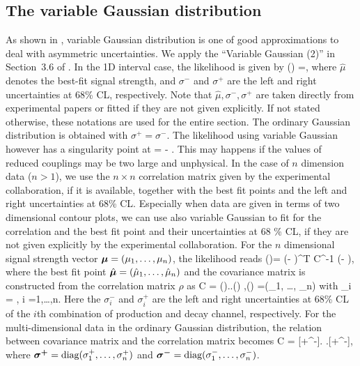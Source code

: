 \subsection*{The variable Gaussian distribution}
As shown in \cite{Barlow:2004wg}, variable Gaussian distribution is one of good approximations to deal with 
asymmetric uncertainties. We apply the  ``Variable Gaussian (2)''  in  Section~3.6 of \cite{Barlow:2004wg}. 
In the 1D interval case, the likelihood is given by
\be \logL(\mu) =,\ee
where $\hat\mu$ denotes the best-fit signal strength, and $\sigma^-$ and $\sigma^+$ are the left and right uncertainties at 68\%
CL, respectively. Note that $\hat\mu, \sigma^-,\sigma^+$ are taken directly from experimental papers or fitted
if they are not given explicitly. If not stated otherwise, these notations are used for the entire section. 
The ordinary Gaussian distribution is obtained with  $\sigma^+ =\sigma^-$. The likelihood using variable Gaussian
however has a singularity point  at 
\be \mu= \hat\mu - \frac{\sigma^+\sigma^-}{\sigma^+ -\sigma^-}.\ee
This may happens if the values of reduced couplings may be two large and unphysical.
 In the case
of $n$ dimension data ($n>1$), we use the $n\times n$ correlation matrix  given by the experimental collaboration, if it is available,
together with the best fit points and the left and right uncertainties at 68\% CL.
Especially when data are given in terms of two dimensional contour plots, we can use also variable Gaussian to fit for the correlation and the best fit point and their uncertainties at 68 \% CL, if they are not given explicitly by the experimental collaboration. For the $n$ dimensional signal strength vector $\bm{\mu} = (\mu_1,\ldots,\mu_n)$, the likelihood reads
\be \logL(\bmu)= (\bmu - \hbmu)^T C^{-1} (\bmu - \hbmu ), \ee
where the best fit point $\hat{\bm{\mu}} = (\hat\mu_1,\ldots,\hat\mu_n)$ and the covariance matrix is constructed from the correlation matrix 
$\rho$ as
\be C = \bm{\Sigma}(\bmu).\rho.\bm{\Sigma}(\bmu) ,\quad \bm{\Sigma}(\bmu) =\diag (\Sigma_1, \ldots, \Sigma_n) \ee
with
\be \Sigma_i = , \quad i =1,\ldots,n.\ee
Here the $\sigma^-_i$ and $\sigma^+_i$ are the left and right uncertainties at 68\% CL of the $i$th combination of production and decay channel, respectively. For the multi-dimensional data in the ordinary Gaussian distribution, the relation between covariance matrix and the correlation matrix becomes
\be C =  [\bm{\sigma^+}+\bm{\sigma}^-]. \rho.[\bm{\sigma^+}+\bm{\sigma}^-], \ee
where $\bm{\sigma^+}=\text{diag}(\sigma_1^+, \ldots,\sigma_n^+)$ and $\bm{\sigma^-}=\text{diag}(\sigma_1^-, \ldots,\sigma_n^-)$.
\noindent
